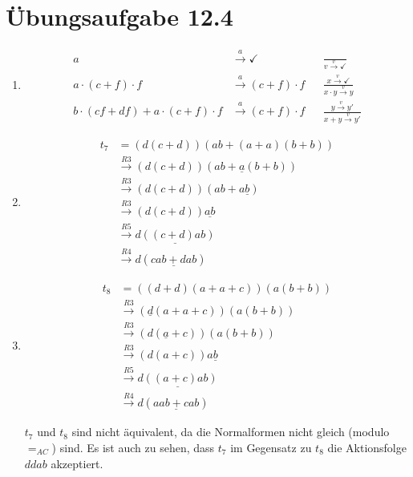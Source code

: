 \documentclass[a4paper]{scrartcl}
\newcommand{\too}{\longrightarrow}
\begin{document}
\section*{Übungsaufgabe 12.4} 
\begin{enumerate}
    \item
        \begin{align}
                a &\stackrel{a}{\too} \checkmark & &\frac{}{v \stackrel{v}{\too} \checkmark} \\
                a \cdot (c + f) \cdot f &\stackrel{a}{\too} (c + f) \cdot f & &\frac{x \stackrel{v}{\too} \checkmark}{x \cdot y \stackrel{v}{\too} y} \\
                b \cdot (cf + df) + a \cdot (c + f) \cdot f &\stackrel{a}{\too} (c + f) \cdot f & &\frac{y \stackrel{v}{\too} y'}{x + y \stackrel{v}{\too} y'}
        \end{align}

    \item
        \begin{equation}
            \begin{split}
                t_7 &= (d(c + d))(ab + (a + a)(b + b)) \\
                &\stackrel{R3}{\longrightarrow} (d(c + d))(ab + \underline{a}(b + b)) \\
                &\stackrel{R3}{\longrightarrow} (d(c + d))(ab + a\underline{b}) \\
                &\stackrel{R3}{\longrightarrow} (d(c + d))\underline{ab} \\
                &\stackrel{R5}{\longrightarrow} \underline{d((c + d)ab)} \\
                &\stackrel{R4}{\longrightarrow} d(\underline{cab + dab})
            \end{split}
        \end{equation}

    \item
        \begin{equation}
            \begin{split}
                t_8 &= ((d + d)(a + a + c))(a(b + b)) \\
                &\stackrel{R3}{\longrightarrow} (\underline{d}(a + a + c))(a(b + b)) \\
                &\stackrel{R3}{\longrightarrow} (d(\underline{a} + c))(a(b + b)) \\
                &\stackrel{R3}{\longrightarrow} (d(a + c))a\underline{b} \\
                &\stackrel{R5}{\longrightarrow} \underline{d((a + c)ab)} \\
                &\stackrel{R4}{\longrightarrow} d(\underline{aab + cab})
            \end{split}
        \end{equation}

        $t_7$ und $t_8$ sind nicht äquivalent, da die Normalformen nicht gleich
        (modulo $=_{AC}$) sind.
        Es ist auch zu sehen, dass $t_7$ im Gegensatz zu $t_8$ die Aktionsfolge
        $ddab$ akzeptiert.

\end{enumerate}
\end{document}
